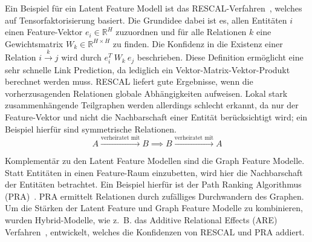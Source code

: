 \documentclass[11pt, a4paper]{scrreprt}
\begin{document}
Ein Beispiel für ein Latent Feature Modell ist das RESCAL-Verfahren~\cite{nickel:2013}, welches auf Tensorfaktorisierung basiert.
Die Grundidee dabei ist es, allen Entitäten $i$ einen Feature-Vektor $e_i \in \mathbb{R}^H$ zuzuordnen und für alle Relationen $k$ eine Gewichtsmatrix $W_k \in \mathbb{R}^{H \times H}$ zu finden.
Die Konfidenz in die Existenz einer Relation $i \xrightarrow{k} j$ wird durch $e_i^T\ W_k\ e_j$ beschrieben.
Diese Definition ermöglicht eine sehr schnelle Link Prediction, da lediglich ein Vektor-Matrix-Vektor-Produkt berechnet werden muss.
RESCAL liefert gute Ergebnisse, wenn die vorherzusagenden Relationen globale Abhängigkeiten aufweisen.
Lokal stark zusammenhängende Teilgraphen werden allerdings schlecht erkannt, da nur der Feature-Vektor und nicht die Nachbarschaft einer Entität berücksichtigt wird;
ein Beispiel hierfür sind symmetrische Relationen.
$$A \xrightarrow{\text{verheiratet mit}} B \implies B \xrightarrow{\text{verheiratet mit}} A$$

Komplementär zu den Latent Feature Modellen sind die Graph Feature Modelle.
Statt Entitäten in einen Feature-Raum einzubetten, wird hier die Nachbarschaft der Entitäten betrachtet.
Ein Beispiel hierfür ist der Path Ranking Algorithmus (PRA)~\cite{lao:2011}. PRA ermittelt Relationen durch zufälliges Durchwandern des Graphen.
Um die Stärken der Latent Feature und Graph Feature Modelle zu kombinieren, wurden Hybrid-Modelle, wie z.~B. das Additive Relational Effects (ARE) Verfahren~\cite{nickel:2014}, entwickelt, welches die Konfidenzen von RESCAL und PRA addiert.\\
\end{document}
